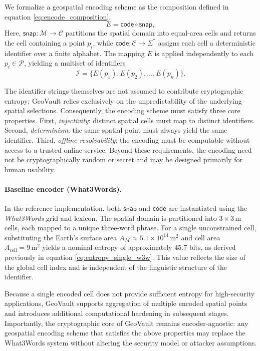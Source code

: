 \documentclass[journal,article,accept,pdftex,moreauthors]{Definitions/mdpi}
\begin{document}
We formalize a geospatial encoding scheme as the composition defined in equation \ref{eq:encode_composition}.
\begin{equation}
    E = \mathsf{code} \circ \mathsf{snap},
    \label{eq:encode_composition}
\end{equation}
Here, $\mathsf{snap}: \mathcal{M} \rightarrow \mathcal{C}$ partitions the spatial domain into equal-area cells and returns the cell containing a point $p_i$, while $\mathsf{code}: \mathcal{C} \rightarrow \Sigma^{*}$ assigns each cell a deterministic identifier over a finite alphabet. The mapping $E$ is applied independently to each $p_i \in \mathcal{P}$, yielding a multiset of identifiers
\begin{equation}
    \mathcal{I} = \{E(p_1), E(p_2), \dots, E(p_n)\}.
    \label{eq:identifier_multiset}
\end{equation}

The identifier strings themselves are not assumed to contribute cryptographic entropy; GeoVault relies exclusively on the unpredictability of the underlying spatial selections. Consequently, the encoding scheme must satisfy three core properties. First, \emph{injectivity}: distinct spatial cells must map to distinct identifiers. Second, \emph{determinism}: the same spatial point must always yield the same identifier. Third, \emph{offline resolvability}: the encoding must be computable without access to a trusted online service. Beyond these requirements, the encoding need not be cryptographically random or secret and may be designed primarily for human usability.

\paragraph{Baseline encoder (What3Words).}
In the reference implementation, both $\mathsf{snap}$ and $\mathsf{code}$ are instantiated using the \emph{What3Words} grid and lexicon. The spatial domain is partitioned into $3 \times 3\,\mathrm{m}$ cells, each mapped to a unique three-word phrase. For a single unconstrained cell, substituting the Earth’s surface area $A_{\mathcal{M}} \approx 5.1 \times 10^{14}\,\mathrm{m}^2$ and cell area $A_{\mathrm{cell}} = 9\,\mathrm{m}^2$ yields a nominal entropy of approximately $45.7$ bits, as derived previously in equation \ref{eq:entropy_single_w3w}. This value reflects the size of the global cell index and is independent of the linguistic structure of the identifier.

Because a single encoded cell does not provide sufficient entropy for high-security applications, GeoVault supports aggregation of multiple encoded spatial points and introduces additional computational hardening in subsequent stages. Importantly, the cryptographic core of GeoVault remains encoder-agnostic: any geospatial encoding scheme that satisfies the above properties may replace the What3Words system without altering the security model or attacker assumptions.
\end{document}
